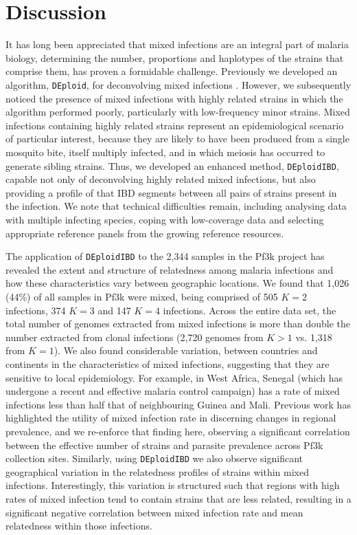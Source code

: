 \documentclass[9pt,lineno]{elife}
\begin{document}
\section{Discussion}

It has long been appreciated that mixed infections are an integral part of malaria biology, determining the number, proportions and haplotypes of the strains that comprise them, has proven a formidable challenge.  Previously we developed an algorithm, \texttt{DEploid}, for deconvolving mixed infections \citep{Zhu2017}.  However, we subsequently noticed the presence of mixed infections with highly related strains in which the algorithm performed poorly, particularly with low-frequency minor strains.  Mixed infections containing highly related strains represent an epidemiological scenario of particular interest, because  they are likely to have been produced from a single mosquito bite, itself multiply infected, and in which meiosis has occurred to generate sibling strains. Thus, we developed an enhanced method, \texttt{DEploidIBD}, capable not only of deconvolving highly related mixed infections, but also providing a profile of that IBD segments between all pairs of strains present in the infection.  We note that technical difficulties remain, including analysing data with multiple infecting species, coping with low-coverage data and selecting appropriate reference panels from the growing reference resources.

The application of \texttt{DEploidIBD} to the 2,344 samples in the Pf3k project has revealed the extent and structure of relatedness among malaria infections and how these characteristics vary between geographic locations. We found that 1,026 (44\%) of all samples in Pf3k were mixed, being comprised of 505 $K=2$ infections, 374 $K=3$ and 147 $K=4$ infections. Across the entire data set, the total number of genomes extracted from mixed infections is more than double the number extracted from clonal infections (2,720 genomes from $K>1$ vs. 1,318 from $K=1$).  We also found  considerable variation, between countries and continents in the characteristics of mixed infections, suggesting that they are sensitive to local epidemiology.  For example, in West Africa, Senegal (which has undergone a recent and effective malaria control campaign) has a rate of mixed infections less than half that of neighbouring Guinea and Mali.  Previous work has highlighted the utility of mixed infection rate in discerning changes in regional prevalence, and we re-enforce that finding here, observing a significant correlation between the effective number of strains and parasite prevalence across Pf3k collection sites. Similarly, using \texttt{DEploidIBD} we also observe significant geographical variation in the relatedness profiles of strains within mixed infections.  Interestingly, this variation is structured such that regions with high rates of mixed infection tend to contain strains that are less related, resulting in a significant negative correlation between mixed infection rate and mean relatedness within those infections.
\end{document}
